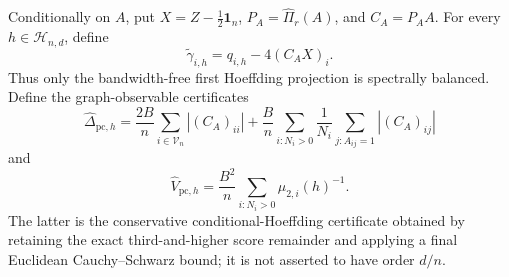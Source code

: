Conditionally on \(A\), put \(X=Z-\tfrac12\mathbf1_n\), \(P_A=\widehat\Pi_r(A)\), and \(C_A=P_AA\).  For every \(h\in\mathcal H_{n,d}\), define
\[
 \widetilde\gamma_{i,h}=q_{i,h}-4(C_AX)_i.
\]
Thus only the bandwidth-free first Hoeffding projection is spectrally balanced.  Define the graph-observable certificates
\[
 \widehat\Delta_{\mathrm{pc},h}
 =\frac{2B}{n}\sum_{i\in\mathcal V_n}|(C_A)_{ii}|
 +\frac{B}{n}\sum_{i:N_i>0}\frac1{N_i}
       \sum_{j:A_{ij}=1}|(C_A)_{ij}|
\]
and
\[
 \widehat V_{\mathrm{pc},h}
 =\frac{B^2}{n}\sum_{i:N_i>0}\mu_{2,i}(h)^{-1}.
\]
The latter is the conservative conditional-Hoeffding certificate obtained by retaining the exact third-and-higher score remainder and applying a final Euclidean Cauchy--Schwarz bound; it is not asserted to have order \(d/n\).
